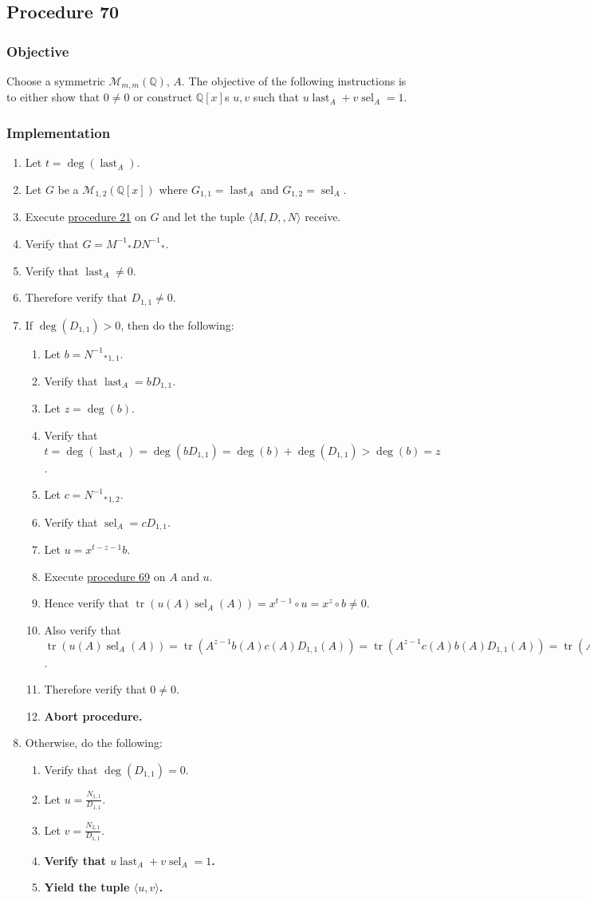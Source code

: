 \documentclass[twocolumn]{article}
\DeclareMathOperator{\tr}{tr}
\DeclareMathOperator{\sel}{sel}
\DeclareMathOperator{\last}{last}
\newcommand{\procedure}[2][]{\subsection*{Procedure #2 \ifthenelse{\equal{#1}{}}{}{(#1)}}\label{sec:procedure #2}}
\newcommand{\objective}{\subsubsection*{Objective}}
\newcommand{\implementation}{\subsubsection*{Implementation}}
\begin{document}
		\procedure{70}
			\objective
				Choose a symmetric $\mathcal{M}_{m,m}(\mathbb{Q})$, $A$. The objective of the following instructions is to either show that $0\ne 0$ or construct $\mathbb{Q}[x]$s $u,v$ such that $u\last_A+v\sel_A=1$.
			\implementation
				\begin{enumerate}
					\item Let $t=\deg(\last_A)$.
					\item Let $G$ be a $\mathcal{M}_{1,2}(\mathbb{Q}[x])$ where $G_{1,1}=\last_A$ and $G_{1,2}=\sel_A$.
					\item Execute \hyperref[sec:procedure 21]{procedure 21} on $G$ and let the tuple $\langle M,D,,N\rangle$ receive.
					\item Verify that $G={M^{-1}}_*D{N^{-1}}_*$.
					\item Verify that $\last_A\ne 0$.
					\item Therefore verify that $D_{1,1}\ne 0$.
					\item If $\deg(D_{1,1})>0$, then do the following:
					\begin{enumerate}
						\item Let $b={{N^{-1}}_*}_{1,1}$.
						\item Verify that $\last_A=bD_{1,1}$.
						\item Let $z=\deg(b)$.
						\item Verify that $t=\deg(\last_A)=\deg(bD_{1,1})=\deg(b)+\deg(D_{1,1})>\deg(b)=z$.
						\item Let $c={{N^{-1}}_*}_{1,2}$.
						\item Verify that $\sel_A=cD_{1,1}$.
						\item Let $u=x^{t-z-1}b$.
						\item Execute \hyperref[sec:procedure 69]{procedure 69} on $A$ and $u$.
						\item Hence verify that $\tr(u(A)\sel_A(A))=x^{t-1}\circ u=x^z\circ b\ne 0$.
						\item Also verify that $\tr(u(A)\sel_A(A))=\tr(A^{z-1}b(A)c(A)D_{1,1}(A))=\tr(A^{z-1}c(A)b(A)D_{1,1}(A))=\tr(A^{z-1}c(A)\last_A(A))=\tr(A^{z-1}c(A)0_{m\times m})=\tr(0_{m\times m})=0$.
						\item Therefore verify that $0\ne 0$.
						\item \textbf{Abort procedure.}
					\end{enumerate}
					\item Otherwise, do the following:
					\begin{enumerate}
						\item Verify that $\deg(D_{1,1})=0$.
						\item Let $u=\frac{N_{1,1}}{D_{1,1}}$.
						\item Let $v=\frac{N_{2,1}}{D_{1,1}}$.
						\item \textbf{Verify that $u\last_A+v\sel_A=1$.}
						\item \textbf{Yield the tuple $\langle u,v\rangle$.}
					\end{enumerate}
				\end{enumerate}
\end{document}
